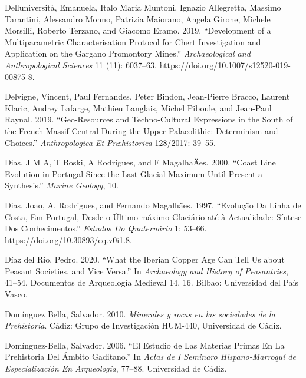 \documentclass[
  a4paper,
  DIV=11,
  numbers=noendperiod]{scrreprt}
\newlength{\cslhangindent}
\newenvironment{CSLReferences}[2] %
 {\begin{list}{}{%
  \setlength{\itemindent}{0pt}
  \setlength{\leftmargin}{0pt}
  \setlength{\parsep}{0pt}
  \ifodd #1
   \setlength{\leftmargin}{\cslhangindent}
   \setlength{\itemindent}{-1\cslhangindent}
  \fi
  \setlength{\itemsep}{#2\baselineskip}}}
 {\end{list}}
\begin{document}
\begin{CSLReferences}{1}{0}
Delluniversità, Emanuela, Italo Maria Muntoni, Ignazio Allegretta,
Massimo Tarantini, Alessandro Monno, Patrizia Maiorano, Angela Girone,
Michele Morsilli, Roberto Terzano, and Giacomo Eramo. 2019.
{``Development of a Multiparametric Characterisation Protocol for Chert
Investigation and Application on the {Gargano Promontory} Mines.''}
\emph{Archaeological and Anthropological Sciences} 11 (11): 6037--63.
\url{https://doi.org/10.1007/s12520-019-00875-8}.

Delvigne, Vincent, Paul Fernandes, Peter Bindon, Jean-Pierre Bracco,
Laurent Klaric, Audrey Lafarge, Mathieu Langlais, Michel Piboule, and
Jean-Paul Raynal. 2019. {``Geo-Resources and Techno-Cultural Expressions
in the South of the {French Massif Central} During the {Upper
Palaeolithic}: Determinism and Choices.''} \emph{Anthropologica Et
Pr{æ}historica} 128/2017: 39--55.

Dias, J M A, T Boski, A Rodrigues, and F MagalhaÄes. 2000. {``Coast Line
Evolution in {Portugal} Since the {Last Glacial Maximum} Until Present
{\DH} a Synthesis.''} \emph{Marine Geology}, 10.

Dias, Joao, A. Rodrigues, and Fernando Magalhães. 1997. {``Evolu{ç}{ã}o
Da Linha de Costa, Em {Portugal}, Desde o {Ú}ltimo m{á}ximo Glaci{á}rio
at{é} {à} Actualidade: {S{í}ntese} Dos Conhecimentos.''} \emph{Estudos
Do Quatern{á}rio} 1: 53--66. \url{https://doi.org/10.30893/eq.v0i1.8}.

Díaz del Río, Pedro. 2020. {``What the {Iberian Copper Age} Can Tell Us
about Peasant Societies, and Vice Versa.''} In \emph{Archaeology and
History of Peasantries}, 41--54. Documentos de Arqueolog{í}a Medieval
14, 16. Bilbao: Universidad del Pa{í}s Vasco.

Domínguez Bella, Salvador. 2010. \emph{{Minerales y rocas en las
sociedades de la Prehistoria}}. C{á}diz: Grupo de Investigaci{ó}n
HUM-440, Universidad de C{á}diz.

Domínguez-Bella, Salvador. 2006. {``El Estudio de Las Materias Primas En
La {Prehistoria} Del {Á}mbito Gaditano.''} In \emph{Actas de {I Seminaro
Hispano-Marroqu{í}} de Especializaci{ó}n En Arqueolog{í}a}, 77--88.
Universidad de C{á}diz.


\end{CSLReferences}
\end{document}
